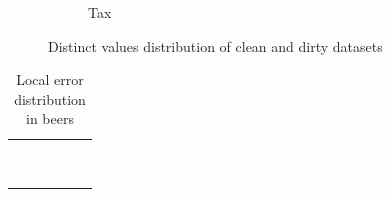 \begin{figure}[!t]
\begin{subfigure}{0.32\textwidth}
    \caption{Tax}
    \label{exp:distincts_tax}
\end{subfigure}
\hfill
\caption{Distinct values distribution of clean and dirty datasets}
\label{exp:distinct_values_datasets}
\end{figure}


\begin{table}[!ht]
\caption{\label{tab:local_errors_beers} Local error distribution in beers}
\centering
\begin{tabular}{r|K|K|P|D|K}
\toprule
{} &  &  &  &  &  \\ \midrule
{}    &         &           &                  &       &                \\
    &         &           &                  &       &                \\
    &         &           &                  &       &                \\
    &         &           &                  &       &                \\
   &         &           &                  &       &                \\
   &         &           &                  &       &                \\
   &         &           &                  &       &                \\
  &         &           &                  &       &                \\
  &         &           &                  &       &                \\
\bottomrule
\end{tabular}
\end{table}


